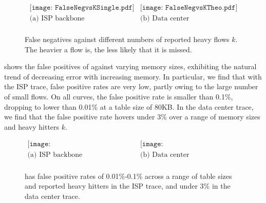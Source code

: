 \begin{figure}
  \centering
  \[
  \begin{array}{ccc}
	\texttt{[image: FalseNegvsKSingle.pdf]} &
	\texttt{[image: FalseNegvsKTheo.pdf]}
    \\
    \mbox{(a) ISP backbone} & \mbox{(b) Data center} \\
  \end{array}
  \]
\caption{False negatives against different numbers of reported heavy flows
  $k$. The heavier a flow is, the less likely that it is missed.}
\label{fig:falseNegvsK}
\end{figure}


  shows the false positives of
\TheSystem against varying memory sizes, exhibiting the natural trend of
decreasing error with increasing memory. In particular, we find that with the
ISP trace, false positive rates are very low, partly owing to the large number
of small flows. On all curves, the false positive rate is smaller than 0.1\%,
dropping to lower than 0.01\% at a table size of 80KB. In the data center trace,
we find that the false positive rate hovers under 3\% over a range of
memory sizes and heavy hitters $k$.


\begin{figure}
  \centering
  \[
  \begin{array}{ccc}
	\texttt{[image: FalsePosvsMsSingle.pdf]} &
	\texttt{[image: FalsePosvsMsTheo.pdf]}
    \\
     \mbox{(a) ISP backbone} & \mbox{(b) Data center} \\
  \end{array}
  \]
\caption{\TheSystem has false positive rates of 0.01\%-0.1\% across a range of
  table sizes and reported heavy hitters in the ISP trace, and under 3\% in
  the data center trace.}
\label{fig:HPPosvsM}
\end{figure}

